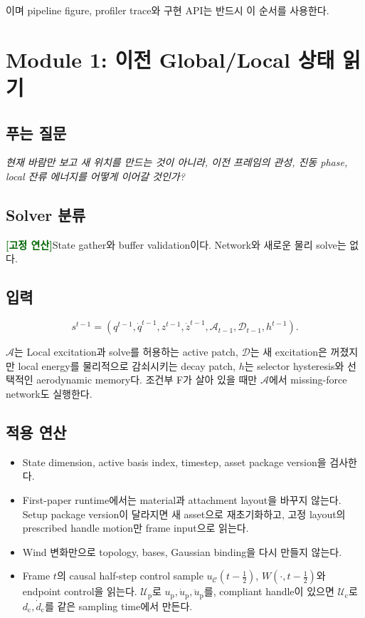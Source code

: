 \documentclass[11pt,a4paper]{article}
\newcommand{\deterministic}{\textcolor{darkgreen}{\textbf{[고정 연산]}}}
\begin{document}
이며 pipeline figure, profiler trace와 구현 API는 반드시 이 순서를 사용한다.

\section{Module 1: 이전 Global/Local 상태 읽기}

\subsection*{푸는 질문}

\emph{현재 바람만 보고 새 위치를 만드는 것이 아니라,
이전 프레임의 관성, 진동 phase, local 잔류 에너지를 어떻게 이어갈 것인가?}

\subsection*{Solver 분류}

\deterministic State gather와 buffer validation이다. Network와 새로운 물리 solve는 없다.

\subsection*{입력}

\begin{equation}
  s^{t-1}
  =
  \left(
  q^{t-1},\dot q^{t-1},
  z^{t-1},\dot z^{t-1},
  \mathcal A_{t-1},
  \mathcal D_{t-1},
  h^{t-1}
  \right).
\end{equation}

\(\mathcal A\)는 Local excitation과 solve를 허용하는 active patch,
\(\mathcal D\)는 새 excitation은 꺼졌지만 local energy를 물리적으로 감쇠시키는 decay patch,
\(h\)는 selector hysteresis와 선택적인 aerodynamic memory다.
조건부 F가 살아 있을 때만 \(\mathcal A\)에서 missing-force network도 실행한다.

\subsection*{적용 연산}

\begin{itemize}[leftmargin=1.5em]
  \item State dimension, active basis index, timestep, asset package version을 검사한다.
  \item First-paper runtime에서는 material과 attachment layout을 바꾸지 않는다.
  Setup package version이 달라지면 새 asset으로 재초기화하고, 고정 layout의 prescribed handle motion만 frame input으로 읽는다.
  \item Wind 변화만으로 topology, bases, Gaussian binding을 다시 만들지 않는다.
  \item Frame \(t\)의 causal half-step control sample
  \(u_{\mathcal C}(t-\tfrac12)\), \(W(\cdot,t-\tfrac12)\)와 endpoint control을 읽는다.
  \(\mathcal U_{\mathrm p}\)로
  \(u_{\mathrm p},\dot u_{\mathrm p},\ddot u_{\mathrm p}\)를,
  compliant handle이 있으면 \(\mathcal U_{\mathrm c}\)로
  \(d_{\mathrm c},\dot d_{\mathrm c}\)를 같은 sampling time에서 만든다.
\end{itemize}
\end{document}
